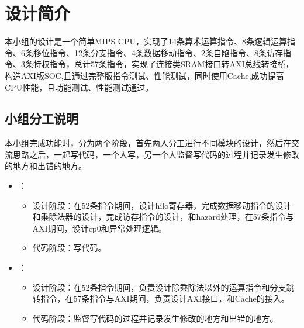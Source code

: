 \section{设计简介}

本小组的设计是一个简单MIPS CPU，实现了14条算术运算指令、8条逻辑运算指令、6条移位指令、12条分支指令、4条数据移动指令、2条自陷指令、8条访存指令、3条特权指令，总计57条指令，实现了连接类SRAM接口转AXI总线转接桥，构造AXI版SOC,且通过完整版指令测试、性能测试，同时使用Cache,成功提高CPU性能，且功能测试、性能测试通过。

\subsection{小组分工说明}


本小组完成功能时，分为两个阶段，首先两人分工进行不同模块的设计，然后在交流思路之后，一起写代码，一个人写，另一个人监督写代码的过程并记录发生修改的地方和出错的地方。

\begin{itemize}
    \item \stunamea：
    \begin{itemize}
        \item 设计阶段：在52条指令期间，设计hilo寄存器，完成数据移动指令的设计和乘除法器的设计，完成访存指令的设计，和hazard处理，在57条指令与AXI期间，设计cp0和异常处理逻辑。
        \item 代码阶段：写代码。
    \end{itemize}
    \item \stunameb：
    \begin{itemize}
        \item 设计阶段：在52条指令期间，负责设计除乘除法以外的运算指令和分支跳转指令，在57条指令与AXI期间，负责设计AXI接口，和Cache的接入。
        \item 代码阶段：监督写代码的过程并记录发生修改的地方和出错的地方。
    \end{itemize}
    
\end{itemize}